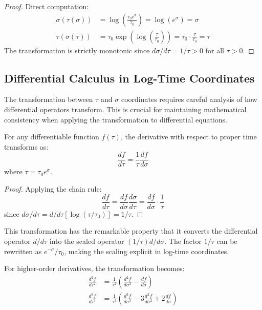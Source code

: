 \begin{proof}
Direct computation:
\begin{align}
\sigma(\tau(\sigma)) &= \log\left(\frac{\tau_0 e^\sigma}{\tau_0}\right) = \log(e^\sigma) = \sigma \\
\tau(\sigma(\tau)) &= \tau_0 \exp\left(\log\left(\frac{\tau}{\tau_0}\right)\right) = \tau_0 \cdot \frac{\tau}{\tau_0} = \tau
\end{align}
The transformation is strictly monotonic since $d\sigma/d\tau = 1/\tau > 0$ for all $\tau > 0$.
\end{proof}

\subsection{Differential Calculus in Log-Time Coordinates}
\label{subsec:differential_calculus}

The transformation between $\tau$ and $\sigma$ coordinates requires careful analysis of how differential operators transform. This is crucial for maintaining mathematical consistency when applying the transformation to differential equations.

\begin{theorem}
\label{thm:chain_rule}
For any differentiable function $f(\tau)$, the derivative with respect to proper time transforms as:
\begin{equation}
\frac{df}{d\tau} = \frac{1}{\tau} \frac{df}{d\sigma}
\label{eq:chain_rule}
\end{equation}
where $\tau = \tau_0 e^\sigma$.
\end{theorem}

\begin{proof}
Applying the chain rule:
\begin{equation}
\frac{df}{d\tau} = \frac{df}{d\sigma} \frac{d\sigma}{d\tau} = \frac{df}{d\sigma} \cdot \frac{1}{\tau}
\end{equation}
since $d\sigma/d\tau = d/d\tau[\log(\tau/\tau_0)] = 1/\tau$.
\end{proof}

This transformation has the remarkable property that it converts the differential operator $d/d\tau$ into the scaled operator $(1/\tau) d/d\sigma$. The factor $1/\tau$ can be rewritten as $e^{-\sigma}/\tau_0$, making the scaling explicit in log-time coordinates.

\begin{corollary}
For higher-order derivatives, the transformation becomes:
\begin{align}
\frac{d^2f}{d\tau^2} &= \frac{1}{\tau^2}\left(\frac{d^2f}{d\sigma^2} - \frac{df}{d\sigma}\right) \\
\frac{d^3f}{d\tau^3} &= \frac{1}{\tau^3}\left(\frac{d^3f}{d\sigma^3} - 3\frac{d^2f}{d\sigma^2} + 2\frac{df}{d\sigma}\right)
\end{align}
\end{corollary}

